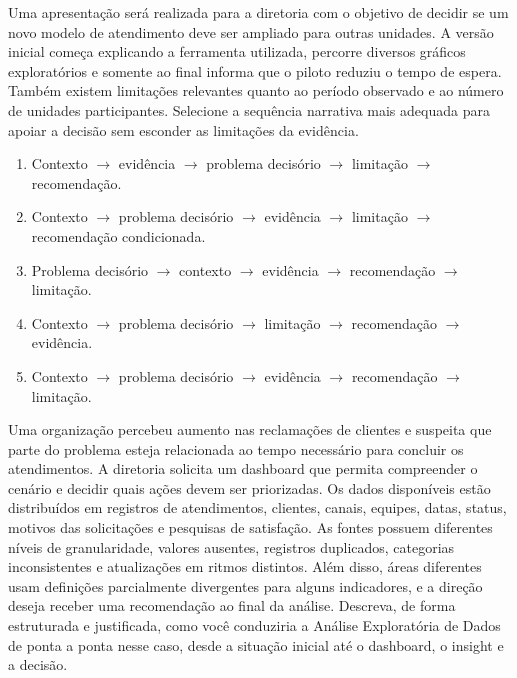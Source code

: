 \documentclass[12pt,a4paper]{article}
\begin{document}
\TextoBase
Uma apresentação será realizada para a diretoria com o objetivo de decidir se um novo modelo de atendimento deve ser ampliado para outras unidades. A versão inicial começa explicando a ferramenta utilizada, percorre diversos gráficos exploratórios e somente ao final informa que o piloto reduziu o tempo de espera. Também existem limitações relevantes quanto ao período observado e ao número de unidades participantes.
\FonteDidatica
\Comando Selecione a sequência narrativa mais adequada para apoiar a decisão sem esconder as limitações da evidência.
\begin{enumerate}[label=\Alph*)]
\item Contexto $\rightarrow$ evidência $\rightarrow$ problema decisório $\rightarrow$ limitação $\rightarrow$ recomendação.
\item Contexto $\rightarrow$ problema decisório $\rightarrow$ evidência $\rightarrow$ limitação $\rightarrow$ recomendação condicionada.
\item Problema decisório $\rightarrow$ contexto $\rightarrow$ evidência $\rightarrow$ recomendação $\rightarrow$ limitação.
\item Contexto $\rightarrow$ problema decisório $\rightarrow$ limitação $\rightarrow$ recomendação $\rightarrow$ evidência.
\item Contexto $\rightarrow$ problema decisório $\rightarrow$ evidência $\rightarrow$ recomendação $\rightarrow$ limitação.
\end{enumerate}

\newpage
{}
\TextoBase
Uma organização percebeu aumento nas reclamações de clientes e suspeita que parte do problema esteja relacionada ao tempo necessário para concluir os atendimentos. A diretoria solicita um dashboard que permita compreender o cenário e decidir quais ações devem ser priorizadas. Os dados disponíveis estão distribuídos em registros de atendimentos, clientes, canais, equipes, datas, status, motivos das solicitações e pesquisas de satisfação. As fontes possuem diferentes níveis de granularidade, valores ausentes, registros duplicados, categorias inconsistentes e atualizações em ritmos distintos. Além disso, áreas diferentes usam definições parcialmente divergentes para alguns indicadores, e a direção deseja receber uma recomendação ao final da análise.
\FonteDidatica
\Comando Descreva, de forma estruturada e justificada, como você conduziria a Análise Exploratória de Dados de ponta a ponta nesse caso, desde a situação inicial até o dashboard, o insight e a decisão.
\EspacoDiscursivaFinal
\end{document}
